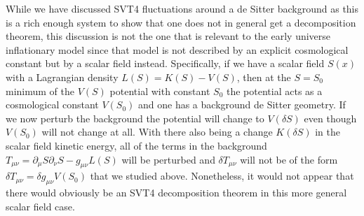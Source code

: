While we have discussed SVT4 fluctuations around a de Sitter background as this is a rich enough system to show that one does not in general get a decomposition theorem, this discussion is not the one that is relevant to the early universe  inflationary model since that model is not described by an explicit cosmological constant but by a scalar field instead. Specifically, if we have a scalar field $S(x)$ with a Lagrangian density $L(S)=K(S)-V(S)$, then at the $S=S_0$ minimum of the $V(S)$ potential with constant $S_0$ the potential acts as a cosmological constant $V(S_0)$ and one has a background de Sitter geometry. If we now perturb the background the potential will change to $V(\delta S)$ even though $V(S_0)$ will not change at all. With there also being a change $K(\delta S)$ in  the scalar field kinetic energy, all of the terms in the background $T_{\mu\nu}=\partial_{\mu}S\partial_{\nu}S-g_{\mu\nu}L(S)$ will be perturbed and $\delta T_{\mu\nu}$ will not be of the form $\delta T_{\mu\nu}=\delta g_{\mu\nu}V(S_0)$ that we studied above. Nonetheless, it would not appear that there would obviously be an SVT4 decomposition theorem in  this more general scalar field case.


